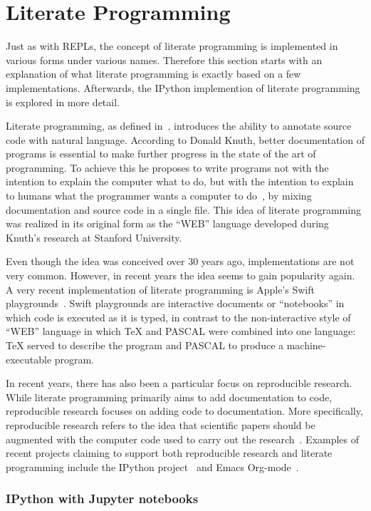 \section{Literate Programming}
\label{sec:a-literate-programming}
Just as with REPLs, the concept of literate programming is implemented in
various forms under various names. Therefore this section starts with an
explanation of what literate programming is exactly based on a few
implementations. Afterwards, the IPython implemention of literate programming is
explored in more detail.

Literate programming, as defined in~\cite{knuth1984}, introduces the ability to
annotate source code with natural language. According to Donald Knuth, better
documentation of programs is essential to make further progress in the state of
the art of programming.  To achieve this he proposes to write programs not with
the intention to explain the computer what to do, but with the intention to
explain to humans what the programmer wants a computer to do~\cite{knuth1984},
by mixing documentation and source code in a single file. This idea of
literate programming was realized in its original form as the ``WEB'' language
developed during Knuth's research at Stanford University.

Even though the idea was conceived over 30 years ago, implementations are not
very common. However, in recent years the idea seems to gain popularity again.
A very recent implementation of literate programming is Apple's Swift
playgrounds~\cite{swift-playgrounds}. Swift playgrounds are interactive
documents or ``notebooks'' in which code is executed as it is typed, in
contrast to the non-interactive style of ``WEB'' language in which \TeX{} and
PASCAL were combined into one language: \TeX{} served to describe the program
and PASCAL to produce a machine-executable program.

In recent years, there has also been a particular focus on reproducible
research. While literate programming primarily aims to add documentation to
code, reproducible research focuses on adding code to documentation. More
specifically, reproducible research refers to the idea that scientific papers
should be augmented with the computer code used to carry out the
research~\cite{schulte2012}. Examples of recent projects claiming to support
both reproducible research and literate programming include the IPython
project~\cite{ipython2007} and Emacs Org-mode~\cite{schulte2012}.

\subsubsection{IPython with Jupyter notebooks}

